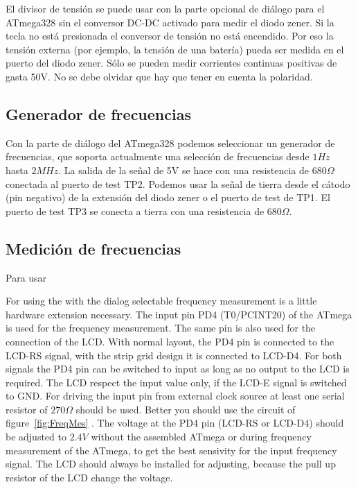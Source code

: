 El divisor de tensión se puede usar con la parte opcional de diálogo para el ATmega328 sin el conversor DC-DC activado
para medir  el diodo zener.  Si la tecla no  está presionada el  conversor de tensión  no está encendido. Por  eso la
tensión externa  (por ejemplo, la tensión  de una batería) pueda  ser medida en el  puerto del diodo zener.  Sólo se
pueden medir corrientes continuas positivas de gasta 50V. No se debe olvidar que hay que tener en cuenta la polaridad.

\subsection{Generador de frecuencias}

Con la  parte de diálogo  del ATmega328 podemos  seleccionar un generador de  frecuencias, que soporta  actualmente una
selección de frecuencias desde  \(1 Hz\) hasta \(2 MHz\). La salida  de la señal de 5V se hace  con una resistencia de
\(680\Omega\) conectada al puerto  de test TP2. Podemos usar la  señal de tierra desde el cátodo  (pin negativo) de la
extensión del diodo zener o el puerto de test de TP1. El  puerto de test TP3 se conecta a tierra con una resistencia de
\(680\Omega\).

\subsection{Medición de frecuencias}

Para usar

For using the with the dialog selectable frequency measurement is a little hardware extension
necessary. The input pin PD4 (T0/PCINT20) of the ATmega is used for the frequency measurement.
The same pin is also used for the connection of the LCD. With normal layout, the PD4 pin is connected
to the LCD-RS signal, with the strip grid design it is connected to LCD-D4.
For both signals the PD4 pin can be switched to input as long as no output to the LCD is
required. The LCD respect the input value only, if the LCD-E signal is switched to GND.
For driving the input pin from external clock source at least one serial resistor of \(270\Omega\) should be used.
Better you should use the circuit of figure~\ref{fig:FreqMes} .
The voltage at the PD4 pin (LCD-RS or LCD-D4) should be adjusted to \(2.4V\) without the assembled ATmega
or during frequency measurement of the ATmega, to get the best sensivity for the input frequency signal.
The LCD should always be installed for adjusting, because the pull up resistor of the LCD change the voltage.

